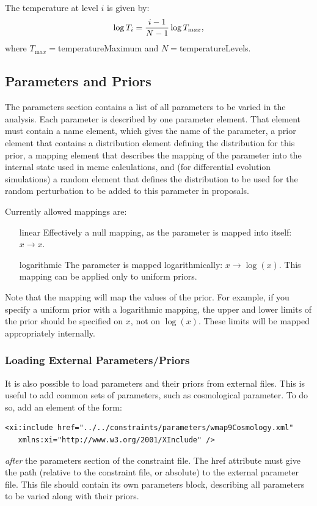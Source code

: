 The temperature at level $i$ is given by:
\begin{equation}
\log T_i = {i-1 \over N-1} \log T_{\mathrm max},
\end{equation}
where $T_{\mathrm max}=${\normalfont \ttfamily temperatureMaximum} and $N=${\normalfont \ttfamily temperatureLevels}.

\subsection{Parameters and Priors}\label{sec:ParametersPriors}

The {\normalfont \ttfamily parameters} section contains a list of all parameters to be varied in the analysis. Each parameter is described by one {\normalfont \ttfamily parameter} element. That element must contain a {\normalfont \ttfamily name} element, which gives the name of the parameter, a {\normalfont \ttfamily prior} element that contains a {\normalfont \ttfamily distribution} element defining the distribution for this prior, a {\normalfont \ttfamily mapping} element that describes the mapping of the parameter into the internal state used in \gls{mcmc} calculations, and (for differential evolution simulations) a {\normalfont \ttfamily random} element that defines the distribution to be used for the random perturbation to be added to this parameter in proposals.

Currently allowed mappings are:
\begin{itemize}
\item[{\normalfont \ttfamily linear}] Effectively a null mapping, as the parameter is mapped into itself: $x \rightarrow x$.
\item[{\normalfont \ttfamily logarithmic}] The parameter is mapped logarithmically: $x \rightarrow \log(x)$. This mapping can be applied only to uniform priors.
\end{itemize}
Note that the mapping will map the values of the prior. For example, if you specify a uniform prior with a logarithmic mapping, the upper and lower limits of the prior should be specified on $x$, not on $\log(x)$. These limits will be mapped appropriately internally.

\subsubsection{Loading External Parameters/Priors}

It is also possible to load parameters and their priors from external files. This is useful to add common sets of parameters, such as cosmological parameter. To do so, add an element of the form:
\begin{verbatim}
<xi:include href="../../constraints/parameters/wmap9Cosmology.xml" 
   xmlns:xi="http://www.w3.org/2001/XInclude" />
\end{verbatim}
\emph{after} the {\normalfont \ttfamily parameters} section of the constraint file. The {\normalfont \ttfamily href} attribute must give the path (relative to the constraint file, or absolute) to the external parameter file. This file should contain its own {\normalfont \ttfamily parameters} block, describing all parameters to be varied along with their priors. 

